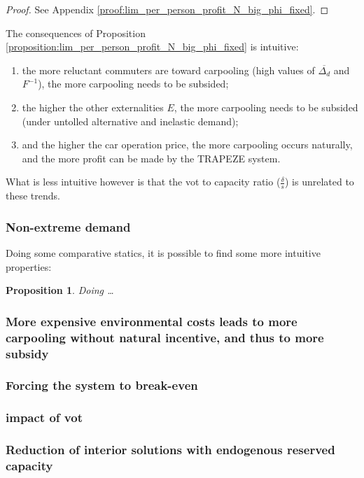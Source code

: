 \documentclass[english, a4paper]{article}
\theoremstyle{plain}
\newtheorem{proposition}{Proposition}
\theoremstyle{definition}
\theoremstyle{remark}
\begin{document}
\begin{proof}
    See Appendix \ref{proof:lim_per_person_profit_N_big_phi_fixed}.
\end{proof}

The consequences of Proposition \ref{proposition:lim_per_person_profit_N_big_phi_fixed} is intuitive: 
\begin{enumerate}
    \item the more reluctant commuters are toward carpooling (high values of $\overline{\Delta_d}$ and $F^{-1}$), the more carpooling needs to be subsided;
    \item the higher the other externalities $E$, the more carpooling needs to be subsided (under untolled alternative and inelastic demand);
    \item and the higher the car operation price, the more carpooling occurs naturally, and the more profit can be made by the TRAPEZE system.
\end{enumerate}

What is less intuitive however is that the \acrshort{vot} to capacity ratio ($\frac{\delta}{s}$) is unrelated to these trends.

\subsubsection{Non-extreme demand}

Doing some comparative statics, it is possible to find some more intuitive properties:

\begin{proposition}
    \label{proposition:intuitive_comparative_statics}
    Doing …
\end{proposition}

\subsubsection{More expensive environmental costs leads to more carpooling without natural incentive, and thus to more subsidy}
\subsubsection{Forcing the system to break-even}
\subsubsection{impact of vot}
\subsubsection{Reduction of interior solutions with endogenous reserved capacity}
\end{document}
